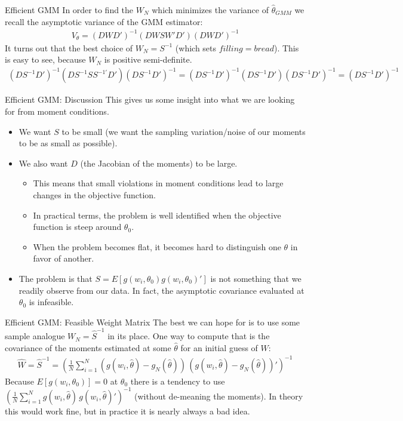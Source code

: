 \documentclass[aspectratio=169]{beamer}
\begin{document}
\begin{frame}{Efficient GMM}
 In order to find the $W_N$ which minimizes the variance of $\hat{\theta}_{GMM}$ we recall the asymptotic variance of the GMM estimator:
\begin{eqnarray*}
V_{\theta} =(D W D')^{-1} (D W S W' D') (D W D')^{-1}
\end{eqnarray*}
It turns out that the best choice of $W_N = S^{-1}$ (which sets $filling = bread$). This is easy to see, because $W_N$ is positive semi-definite.
\begin{eqnarray*}
(D S^{-1} D')^{-1} (D S^{-1} S S^{-1'} D') (D S^{-1} D')^{-1} = (D S^{-1} D')^{-1} (D S^{-1} D') (D S^{-1} D')^{-1} = (D S^{-1} D')^{-1}
\end{eqnarray*}
\end{frame}

\begin{frame}{Efficient GMM: Discussion}
This gives us some insight into what we are looking for from moment conditions. 

\begin{itemize}
\item We want $S$ to be small (we want the sampling variation/noise of our moments to be as small as possible). 
\item We also want $D$ (the Jacobian of the moments) to be large. 
\begin{itemize}
\item This means that small violations in moment conditions lead to large changes in the objective function. 
\item In practical terms, the problem is well identified when the objective function is steep around $\theta_0$.
\item When the problem becomes flat, it becomes hard to distinguish one $\theta$ in favor of another.
\end{itemize}
\item The problem is that $S = E[g(w_i,\theta_0) g(w_i,\theta_0)']$ is not something that we readily observe from our data. In fact, the asymptotic covariance evaluated at $\theta_0$ is \alert{infeasible}.
\end{itemize}
\end{frame}

\begin{frame}{Efficient GMM: Feasible Weight Matrix}
The best we can hope for is to use some sample analogue $W_N=\hat{S}^{-1}$ in its place. One way to compute that is the covariance of the moments estimated at some $\hat{\theta}$ for an initial guess of $W$:
\begin{eqnarray*}
\hat{W} = \hat{S}^{-1} = \left(\frac{1}{N} \sum_{i=1}^N (g(w_i,\hat{\theta}) - g_N(\hat{\theta}))  \, (g(w_i,\hat{\theta}) - g_N(\hat{\theta}))'\right)^{-1}
\end{eqnarray*}
Because $E[g(w_i,\theta_0)]=0$ at $\theta_0$ there is a tendency to use $\left(\frac{1}{N} \sum_{i=1}^N g(w_i,\hat{\theta}) \, g(w_i,\hat{\theta} )'\right)^{-1}$ (without de-meaning the moments). In theory this would work fine, but in practice \alert{it is nearly always a bad idea}.\\
\end{frame}
\end{document}
